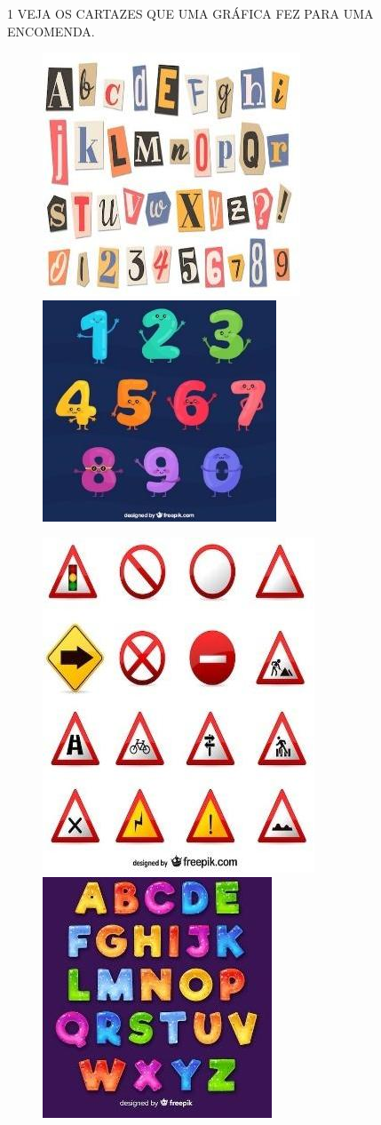 
\num{1} VEJA OS CARTAZES QUE UMA GRÁFICA FEZ PARA UMA ENCOMENDA.

\begin{figure}[htpb!]
\includegraphics[width=.4\textwidth]{media/image183.jpg}
\includegraphics[width=.4\textwidth]{media/image184.jpg}

\includegraphics[width=.4\textwidth]{media/image185.jpg}
\includegraphics[width=.4\textwidth]{media/image186.jpg}
\end{figure}


